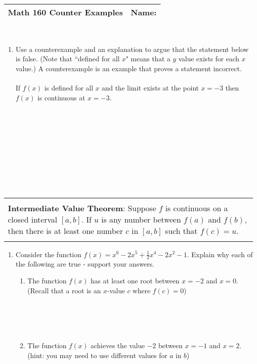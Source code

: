\documentclass[12pt]{report}
\newenvironment{boxe}
    {\begin{center}
    \begin{tabular}{|p{0.9\textwidth}|}
    \hline\\
    }
    { 
    \\\\\hline
    \end{tabular} 
    \end{center}
    }
\begin{document}
\begin{tabular*}{\textwidth}{@{\extracolsep{\fill}}ll}
\textbf{Math 160} Counter Examples & \;\;Name: \hrulefill \\
\hline\hline
\end{tabular*} \\


\begin{enumerate} 
\item Use a counterexample and an explanation to argue that the statement 
below is false. (Note that ``defined for all $x$" means that a $y$ value exists for each $x$ value.) A counterexample is an example that proves a statement incorrect. \\\\
If $f(x)$ is defined for all $x$ and the limit exists at the point $x=-3$ then $f(x)$ is continuous at $x=-3$.\\\\\\\\\\\\\\\\\\\\


\end{enumerate} 

\begin{boxe}
\textbf{Intermediate Value Theorem}: Suppose $f$ is continuous on a closed interval $[a,b]$. If $u$ is any number between $f(a)$ and $f(b)$, then there is at least one number $c$ in $[a,b]$ such that $f(c)=u$.
\end{boxe}
\begin{enumerate}[resume*]
\item Consider the function $f(x)=x^{6}-2x^{5}+\frac{1}{2}x^{4}-2x^{2}-1$. Explain why each of the following are true - support your answers.\\
\begin{enumerate}[label=\alph*.]
    \item The function $f(x)$ has at least one root between $x=-2$ and $x=0$. (Recall that a root is an $x$-value $c$ where $f(c)=0$)\\\\\\\\\\
    \item The function $f(x)$ achieves the value $-2$ between $x=-1$ and $x=2$. (hint: you may need to use different values for $a$ in $b$)\\\\\\\\\\\\\\\\
\end{enumerate}
\end{enumerate}

\newpage
\end{document}
